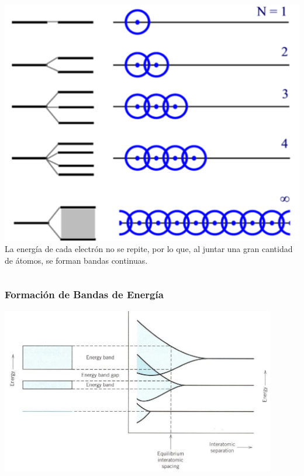\documentclass[10pt,t,aspectratio=169]{beamer}
\begin{document}
\begin{frame}[t]
\begin{columns}
\begin{column}[]{0.4\textwidth}
        \centering
        \includegraphics[width=\textwidth]{./figures/formacion-bandas-1.png}
        \small{La energía de cada electrón no se repite, por lo que, al juntar una gran cantidad de átomos, se forman bandas continuas.}
        
    \end{column}
    
    \end{columns}
    
\end{frame}


\begin{frame}[t]
    \frametitle{Formación de Bandas de Energía}

    \centering
    \includegraphics[width=12cm]{./figures/formacion-bandas-3.jpg}
\end{frame}
\end{document}

